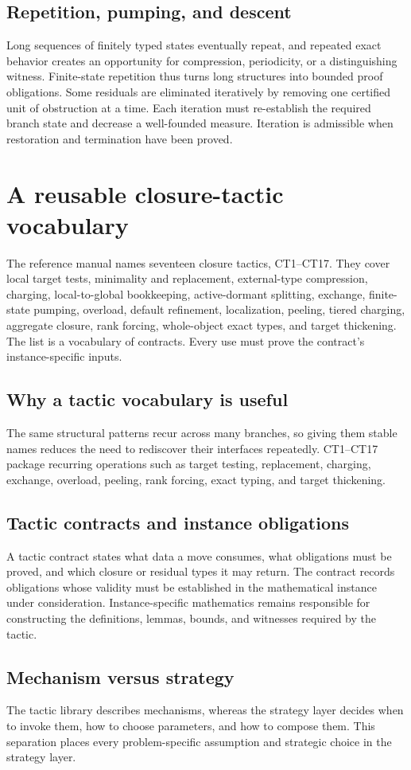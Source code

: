 \documentclass[11pt]{article}
\begin{document}
\subsection{Repetition, pumping, and descent}
Long sequences of finitely typed states eventually repeat, and repeated exact behavior creates an opportunity for compression, periodicity, or a distinguishing witness.
Finite-state repetition thus turns long structures into bounded proof obligations.
Some residuals are eliminated iteratively by removing one certified unit of obstruction at a time.
Each iteration must re-establish the required branch state and decrease a well-founded measure.
Iteration is admissible when restoration and termination have been proved.
\section{A reusable closure-tactic vocabulary}
The reference manual names seventeen closure tactics, CT1--CT17. They cover
local target tests, minimality and replacement, external-type compression,
charging, local-to-global bookkeeping, active-dormant splitting, exchange,
finite-state pumping, overload, default refinement, localization, peeling,
tiered charging, aggregate closure, rank forcing, whole-object exact types,
and target thickening. The list is a vocabulary of contracts. Every use must
prove the contract's instance-specific inputs.
\subsection{Why a tactic vocabulary is useful}
The same structural patterns recur across many branches, so giving them stable names reduces the need to rediscover their interfaces repeatedly.
CT1–CT17 package recurring operations such as target testing, replacement, charging, exchange, overload, peeling, rank forcing, exact typing, and target thickening.
\subsection{Tactic contracts and instance obligations}
A tactic contract states what data a move consumes, what obligations must be proved, and which closure or residual types it may return.
The contract records obligations whose validity must be established in the mathematical instance under consideration.
Instance-specific mathematics remains responsible for constructing the definitions, lemmas, bounds, and witnesses required by the tactic.
\subsection{Mechanism versus strategy}
The tactic library describes mechanisms, whereas the strategy layer decides when to invoke them, how to choose parameters, and how to compose them.
This separation places every problem-specific assumption and strategic choice in the strategy layer.
\end{document}
